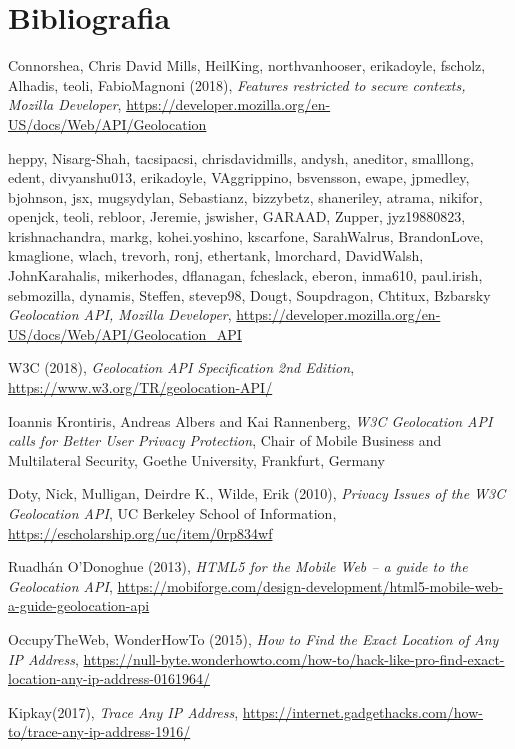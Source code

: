 \documentclass[11pt ,a4paper , twoside , openright ]{article}
\begin{document}
\section{Bibliografia}
\begin{thebibliography}{99}
		\bibitem{}
	Connorshea, Chris David Mills, HeilKing, northvanhooser, erikadoyle, fscholz, Alhadis, teoli, FabioMagnoni (2018),
	\emph{Features restricted to secure contexts, Mozilla Developer},
	\url{https://developer.mozilla.org/en-US/docs/Web/API/Geolocation}
	
	\bibitem{}
	heppy, Nisarg-Shah, tacsipacsi, chrisdavidmills, andysh, aneditor, smalllong, edent, divyanshu013, erikadoyle, VAggrippino, bsvensson, ewape, jpmedley, bjohnson, jsx, mugsydylan, Sebastianz, bizzybetz, shaneriley, atrama, nikifor, openjck, teoli, rebloor, Jeremie, jswisher, GARAAD, Zupper, jyz19880823, krishnachandra, markg, kohei.yoshino, kscarfone, SarahWalrus, BrandonLove, kmaglione, wlach, trevorh, ronj, ethertank, lmorchard, DavidWalsh, JohnKarahalis, mikerhodes, dflanagan, fcheslack, eberon, inma610, paul.irish, sebmozilla, dynamis, Steffen, stevep98, Dougt, Soupdragon, Chtitux, Bzbarsky
	\emph{Geolocation API, Mozilla Developer},
	\url{https://developer.mozilla.org/en-US/docs/Web/API/Geolocation_API}
	
	\bibitem{}
	W3C (2018), 
	\emph{Geolocation API Specification 2nd Edition},
	\url{https://www.w3.org/TR/geolocation-API/}
	
	\bibitem{}
	Ioannis Krontiris, Andreas Albers and Kai Rannenberg,
	\emph{W3C Geolocation API calls for
		Better User Privacy Protection}, 
	Chair of Mobile Business and Multilateral Security, Goethe University, Frankfurt, Germany
	
	\bibitem{}
	Doty, Nick, Mulligan, Deirdre K., Wilde, Erik (2010),
	\emph{Privacy Issues of the W3C Geolocation API}, UC Berkeley School of Information, \url{https://escholarship.org/uc/item/0rp834wf}
	
	\bibitem{}
	Ruadhán O'Donoghue (2013),
	\emph{HTML5 for the Mobile Web – a guide to the Geolocation API}, \url{https://mobiforge.com/design-development/html5-mobile-web-a-guide-geolocation-api}
	
	\bibitem{}
	OccupyTheWeb, WonderHowTo (2015),
	\emph{How to Find the Exact Location of Any IP Address}, \url{https://null-byte.wonderhowto.com/how-to/hack-like-pro-find-exact-location-any-ip-address-0161964/}
	
	\bibitem{}
	Kipkay(2017), 
	\emph{Trace Any IP Address}, \url{https://internet.gadgethacks.com/how-to/trace-any-ip-address-1916/}
	

\end{thebibliography}
\end{document}
